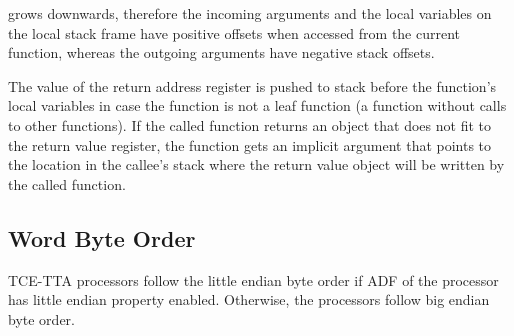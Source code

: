 \documentclass[twoside]{tceusermanual}
\begin{document}


grows downwards, therefore the incoming arguments and the local variables on
the local stack frame have positive offsets when accessed from the current
function, whereas the outgoing arguments have negative stack offsets.


The value of the return address register is pushed to stack before the 
function's local variables in case the function is not a leaf function
(a function without calls to other functions). If the called function returns 
an object that does not fit to the return value register, the function 
gets an implicit argument that points to the location in the callee's 
stack where the return value object will be written by the called function. 

\subsection{Word Byte Order}
\label{ssec:word-order}

TCE-TTA processors follow the little endian byte order if ADF of the
processor has little endian property enabled. Otherwise, the processors
follow big endian byte order.
\end{document}
